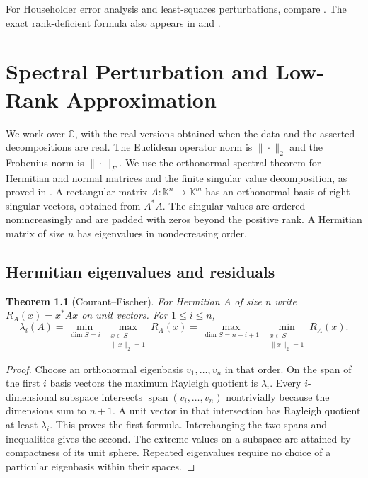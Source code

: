 \documentclass[11pt,oneside,openany]{book}
\theoremstyle{plain}
\newtheorem{theorem}{Theorem}[chapter]
\theoremstyle{definition}
\theoremstyle{remark}
\begin{document}
For Householder error analysis and least-squares perturbations,
compare \cite[Chapters~19--20]{higham}. The exact rank-deficient
formula also appears in \cite[Section~5.5]{golub} and
\cite[entries 14.least\_squares and 14.svd\_pseudoinverse]{d05}.
\chapter{Spectral Perturbation and Low-Rank Approximation}

We work over \(\mathbb C\), with the real versions obtained when the
data and the asserted decompositions are real. The Euclidean
operator norm is \(\|\cdot\|_2\) and the Frobenius norm is
\(\|\cdot\|_F\). We use the orthonormal spectral theorem for
Hermitian and normal matrices and the finite singular value
decomposition, as proved in \cite[Modules 13 and 14]{d05}.
A rectangular matrix \(A:\mathbb K^n\to\mathbb K^m\) has an
orthonormal basis of right singular vectors, obtained from
\(A^*A\). The singular values are ordered nonincreasingly and
are padded with zeros beyond the positive rank. A Hermitian
matrix of size \(n\) has eigenvalues in nondecreasing order.

\section{Hermitian eigenvalues and residuals}

\begin{theorem}[Courant--Fischer]\label{p206:W36}
For Hermitian \(A\) of size \(n\) write \(R_A(x)=x^*Ax\)
on unit vectors. For \(1\le i\le n\),
\[
 \lambda_i(A)
  = \min_{\dim S=i}\ \max_{\substack{x\in S\\\|x\|_2=1}}R_A(x)
  = \max_{\dim S=n-i+1}\ \min_{\substack{x\in S\\\|x\|_2=1}}R_A(x).
\]
\end{theorem}
\begin{proof}
Choose an orthonormal eigenbasis \(v_1,\ldots,v_n\) in that order.
On the span of the first \(i\) basis vectors the maximum Rayleigh
quotient is \(\lambda_i\). Every \(i\)-dimensional subspace
intersects \(\operatorname{span}(v_i,\ldots,v_n)\) nontrivially
because the dimensions sum to \(n+1\). A unit vector in that
intersection has Rayleigh quotient at least \(\lambda_i\).
This proves the first formula. Interchanging the two spans and
inequalities gives the second. The extreme values on a subspace
are attained by compactness of its unit sphere. Repeated eigenvalues
require no choice of a particular eigenbasis within their spaces.
\end{proof}
\end{document}

